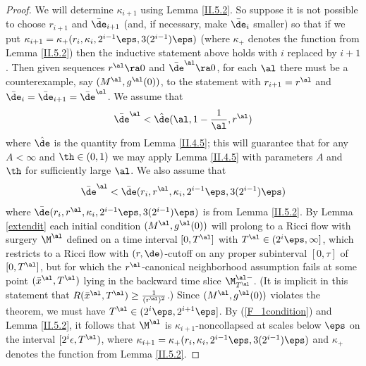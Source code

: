 \begin{proof}
We will determine $\kappa_{i+1}$ using Lemma \ref{II.5.2}.
So suppose it is not possible to choose $r_{i+1}$
and $\bar\de_{i+1}$ (and, if necessary, make $\bar\de_i$ smaller)
so that if we put
$\kappa_{i+1}= \kappa_+(r_i,\kappa_i,2^{i-1}\eps,
3(2^{i-1})\eps)$ (where $\kappa_+$ denotes the function from
Lemma \ref{II.5.2})
then the inductive statement above holds with $i$ replaced by $i+1$.
Then given sequences $r^\al\ra 0$ and $\bar\de^\al\ra 0$, for each
$\al$ there
must be a counterexample, say $(M^{\al},g^{\al}(0))$,
to the statement with $r_{i+1} = r^{\al}$ and
$\bar\de_i = \bar\de_{i+1} = \bar\de^{\al}$. We assume that
\begin{equation}
  \bar\de^\al < \hat\de(\al,1-\frac{1}{\al},r^\al)
\end{equation}
where $\hat\de$ is the quantity from Lemma \ref{II.4.5}; this
will guarantee that for any $A<\infty$ and $\th\in (0,1)$
we may apply Lemma \ref{II.4.5} with parameters $A$ and $\th$
for sufficiently large $\al$.  We also assume that
\begin{equation}
\label{F_1condition}
\bar\de^{\al}<\bar\de(r_i,r^\al,\kappa_i,2^{i-1}\eps,3(2^{i-1})\eps)
\end{equation}
where $\bar\de(r_i,r^\al,\kappa_i,2^{i-1}\eps,3(2^{i-1})\eps)$ is from Lemma \ref{II.5.2}.
 By Lemma \ref{extendit}  each initial condition $(M^{\al},g^{\al}(0))$
will prolong to a Ricci flow
with surgery   $\M^{\al}$ defined on a time interval $[0,T^{\al}]$
with
$T^{\al}\in (2^i\eps,\infty]$,
which restricts to a Ricci flow with $(r,\de)$-cutoff
on any proper subinterval  $[0,\tau]$ of $[0,T^{\al}]$,
 but for which the
$r^\al$-canonical neighborhood assumption fails at some point
$(\bar x^{\al},T^{\al})$ lying in the backward time
slice
$\M^{\al-}_{T^{\al}}$.
(It is implicit in this statement that $R(\bar x^{\al},T^{\al}) \ge
\frac{1}{(r^\al)^2}$.)
Since $(M^{\al},g^{\al}(0))$ violates the
theorem, we must have $T^\al\in (2^i\eps,2^{i+1}\eps]$. By (\ref{F_1condition})
and Lemma \ref{II.5.2}, it follows that  $\M^{\al}$ is
$\kappa_{i+1}$-noncollapsed at scales below $\eps$
on the interval $[2^i \epsilon,T^\al)$, where
$\kappa_{i+1}= \kappa_+(r_i,\kappa_i,2^{i-1}\eps,
3(2^{i-1})\eps)$ and $\kappa_+$ denotes the function from
Lemma \ref{II.5.2}.


\end{proof}
